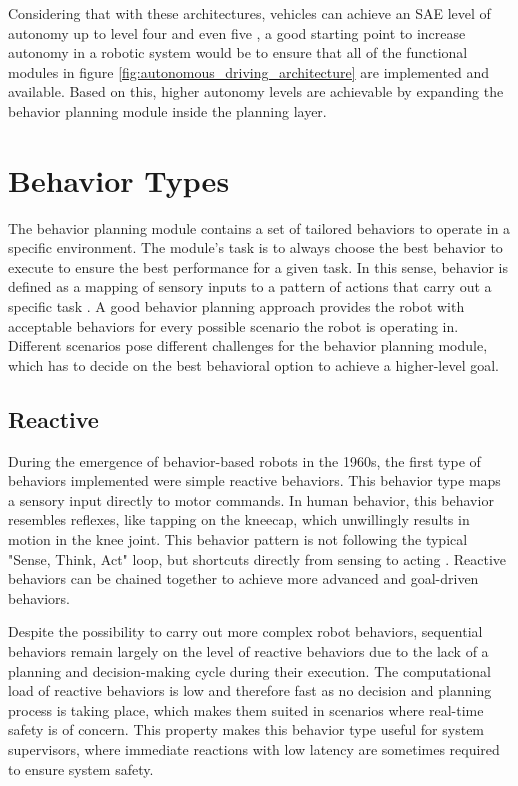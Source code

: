 Considering that with these architectures, vehicles can achieve an SAE level of autonomy up to level four and even five \cite{bacha2008odin}, a good starting point to increase autonomy in a robotic system would be to ensure that all of the functional modules in figure \ref{fig:autonomous_driving_architecture} are implemented and available. Based on this, higher autonomy levels are achievable by expanding the behavior planning module inside the planning layer. 


\section{Behavior Types}
\label{sec:Behavior Types}

The behavior planning module contains a set of tailored behaviors to operate in a specific environment. The module's task is to always choose the best behavior to execute to ensure the best performance for a given task. In this sense, behavior is defined as a mapping of sensory inputs to a pattern of actions that carry out a specific task \cite{murphy2000}. A good behavior planning approach provides the robot with acceptable behaviors for every possible scenario the robot is operating in. Different scenarios pose different challenges for the behavior planning module, which has to decide on the best behavioral option to achieve a higher-level goal. 

\subsection{Reactive}

During the emergence of behavior-based robots in the 1960s, the first type of behaviors implemented were simple reactive behaviors. This behavior type maps a sensory input directly to motor commands. In human behavior, this behavior resembles reflexes, like tapping on the kneecap, which unwillingly results in motion in the knee joint. This behavior pattern is not following the typical "Sense, Think, Act" loop, but shortcuts directly from sensing to acting \cite{desilva2008}. Reactive behaviors can be chained together to achieve more advanced and goal-driven behaviors. 

Despite the possibility to carry out more complex robot behaviors, sequential behaviors remain largely on the level of reactive behaviors due to the lack of a planning and decision-making cycle during their execution. The computational load of reactive behaviors is low and therefore fast as no decision and planning process is taking place, which makes them suited in scenarios where real-time safety is of concern. This property makes this behavior type useful for system supervisors, where immediate reactions with low latency are sometimes required to ensure system safety. 

